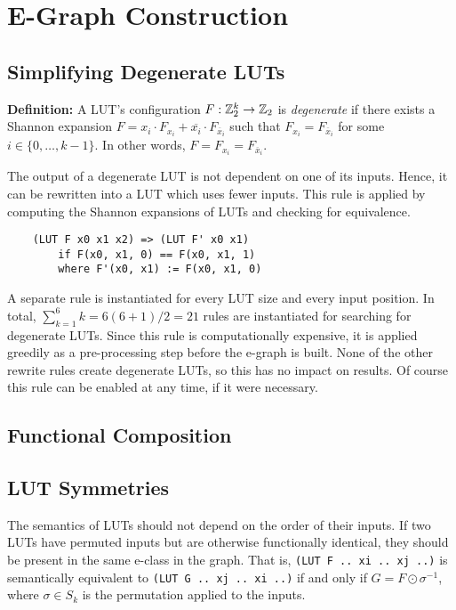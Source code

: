 \section{E-Graph Construction}\label{sec:rewrites}
\subsection{Simplifying Degenerate LUTs}\label{sec:rewrites:degen}

\textbf{Definition:} A LUT's configuration $F : \mathbb{Z}_{2}^{k} \rightarrow \mathbb{Z}_{2}$ is \textit{degenerate} if there exists a Shannon expansion $F = x_i \cdot F_{x_i} + \overline{x_i} \cdot F_{\overline{x}_i}$
such that $F_{x_i} = F_{\overline{x}_i}$ for some $i \in \{ 0, \ldots, k -1\}$. In other words, $F = F_{x_i} = F_{\overline{x}_i}$.

The output of a degenerate LUT is not dependent on one of its inputs. Hence, it
can be rewritten into a LUT which uses fewer inputs. This rule is applied by
computing the Shannon expansions of LUTs and checking for equivalence.

\begin{verbatim}
    (LUT F x0 x1 x2) => (LUT F' x0 x1)
        if F(x0, x1, 0) == F(x0, x1, 1)
        where F'(x0, x1) := F(x0, x1, 0)
\end{verbatim}

A separate rule is instantiated for every LUT size and every input position. In
total, $\sum_{k=1}^{6} k = 6(6+1)/2 = 21$ rules are instantiated for searching
for degenerate LUTs. Since this rule is computationally expensive, it is
applied greedily as a pre-processing step before the e-graph is built. None of
the other rewrite rules create degenerate LUTs, so this has no impact on
results. Of course this rule can be enabled at any time, if it were necessary.

\subsection{Functional Composition}\label{sec:rewrites:composition}

\subsection{LUT Symmetries}\label{sec:rewrites:symmetry}

The semantics of LUTs should not depend on the order of their inputs. If two
LUTs have permuted inputs but are otherwise functionally identical, they should
be present in the same e-class in the graph. That is, \mbox{\texttt{(LUT F ..
        xi .. xj ..)}} is semantically equivalent to \mbox{\texttt{(LUT G .. xj .. xi
        ..)}} if and only if $G = F \odot \sigma^{-1}$, where $\sigma \in S_k$ is the
permutation applied to the inputs.

